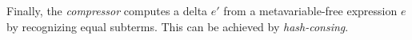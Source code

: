 \documentclass[9pt,authoryear]{sigplanconf}
\begin{document}
Finally, the \emph{compressor} computes a delta $e'$ from a
metavariable-free expression $e$ by recognizing equal subterms. This
can be achieved by \emph{hash-consing}.






\end{document}
